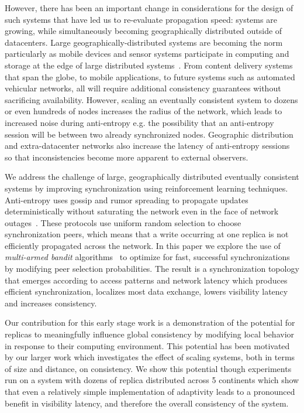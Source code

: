 However, there has been an important change in considerations for the
design of such systems that have led us to re-evaluate propagation speed:
systems are growing, while simultaneously becoming geographically distributed
outside of datacenters.
Large geographically-distributed systems are becoming the norm particularly
as mobile devices and sensor systems participate in computing and storage at
the edge of large distributed
systems~\cite{garcia_lopez_edge-centric_2015,scellato_track_2011}.
From content delivery systems that span the globe, to mobile applications, to
future systems such as automated vehicular networks, all will require
additional consistency guarantees without sacrificing availability.
However, scaling an eventually consistent system to dozens or even hundreds
of nodes increases the radius of the network, which leads to increased noise
during anti-entropy e.g. the possibility that an anti-entropy session will be
between two already synchronized nodes.
Geographic distribution and extra-datacenter networks also increase the
latency of anti-entropy sessions so that inconsistencies become more apparent
to external observers.

We address the challenge of large, geographically distributed eventually
consistent systems by improving synchronization using reinforcement
learning techniques.
Anti-entropy uses gossip and rumor spreading to propagate updates
deterministically without saturating the
network even in the face of network
outages~\cite{haeupler_simple_2015,karp_randomized_2000,moreno_dynamics_2004}.
These protocols use uniform random selection to choose synchronization peers,
which means that a write occurring at one replica is not efficiently
propagated across the network.
In this paper we explore the use of \textit{multi-armed bandit}
algorithms~\cite{langford_epoch-greedy_2008,luo_efficient_2017} to optimize
for fast, successful synchronizations by modifying peer selection
probabilities.
The result is a synchronization topology that emerges according to access
patterns and network latency which produces efficient synchronization,
localizes most data exchange, lowers visibility latency and increases
consistency.

Our contribution for this early stage work is a demonstration of the
potential for replicas to meaningfully influence global consistency by
modifying local behavior in response to their computing environment.
This potential has been motivated by our larger work which investigates the
effect of scaling systems, both in terms of size and distance, on consistency.
We show this potential though experiments run on a system with dozens of
replica distributed across 5 continents which show that even a relatively
simple implementation of adaptivity leads to a pronounced benefit in
visibility latency, and therefore the overall consistency of the system.


